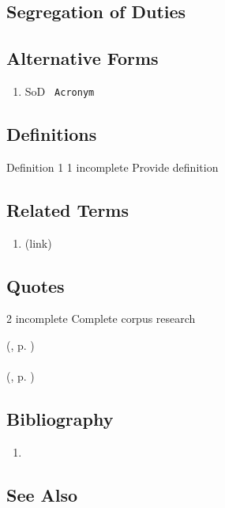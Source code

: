 \newpage \subsection*{Segregation of Duties } \subsection*{Alternative Forms } \begin{enumerate} \item  SoD  \texttt{ Acronym  } \end{enumerate} \subsection*{Definitions } \begin{DIC_Def}{Definition 1 }{} 1  incomplete  Provide definition  \end{DIC_Def} \subsection*{Related Terms } \begin{enumerate} \item  (link) \href{4-Eyes Principle (Dictionary Entry) }{ }   \end{enumerate} \subsection*{Quotes } 2  incomplete  Complete corpus research  \begin{DIC_BlockQuote}   \end{DIC_BlockQuote} (, p. )  \paragraph{} (, p. )  \subsection*{Bibliography } \begin{enumerate} \item  \end{enumerate} \subsection*{See Also } 